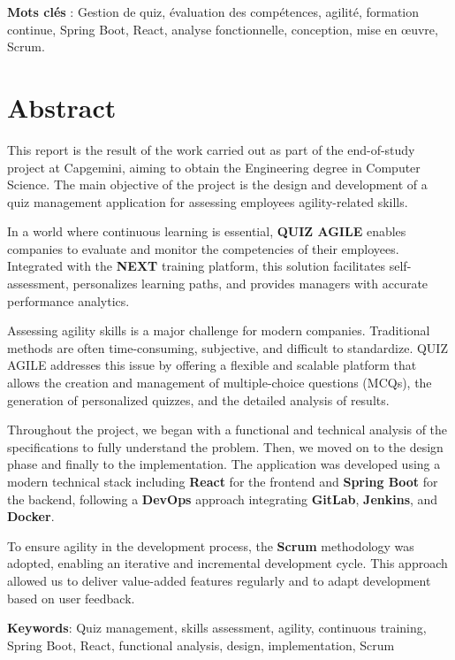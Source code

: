 \documentclass[12pt,a4paper,twoside]{report}
\begin{document}
\textbf{Mots clés} : Gestion de quiz, évaluation des compétences,
agilité, formation continue, Spring Boot, React, analyse fonctionnelle,
conception, mise en œuvre, Scrum.

\hypertarget{abstract}{%
\section{\texorpdfstring{\hfill\break
Abstract}{ Abstract}}\label{abstract}}

This report is the result of the work carried out as part of the
end-of-study project at Capgemini, aiming to obtain the Engineering
degree in Computer Science. The main objective of the project is the
design and development of a quiz management application for assessing
employees\textquotesingle{} agility-related skills.

In a world where continuous learning is essential, \textbf{QUIZ AGILE}
enables companies to evaluate and monitor the competencies of their
employees. Integrated with the \textbf{NEXT} training platform, this
solution facilitates self-assessment, personalizes learning paths, and
provides managers with accurate performance analytics.

Assessing agility skills is a major challenge for modern companies.
Traditional methods are often time-consuming, subjective, and difficult
to standardize. QUIZ AGILE addresses this issue by offering a flexible
and scalable platform that allows the creation and management of
multiple-choice questions (MCQs), the generation of personalized
quizzes, and the detailed analysis of results.

Throughout the project, we began with a functional and technical
analysis of the specifications to fully understand the problem. Then, we
moved on to the design phase and finally to the implementation. The
application was developed using a modern technical stack including
\textbf{React} for the frontend and \textbf{Spring Boot} for the
backend, following a \textbf{DevOps} approach integrating
\textbf{GitLab}, \textbf{Jenkins}, and \textbf{Docker}.

To ensure agility in the development process, the \textbf{Scrum}
methodology was adopted, enabling an iterative and incremental
development cycle. This approach allowed us to deliver value-added
features regularly and to adapt development based on user feedback.

\textbf{Keywords}: Quiz management, skills assessment, agility,
continuous training, Spring Boot, React, functional analysis, design,
implementation, Scrum
\end{document}
